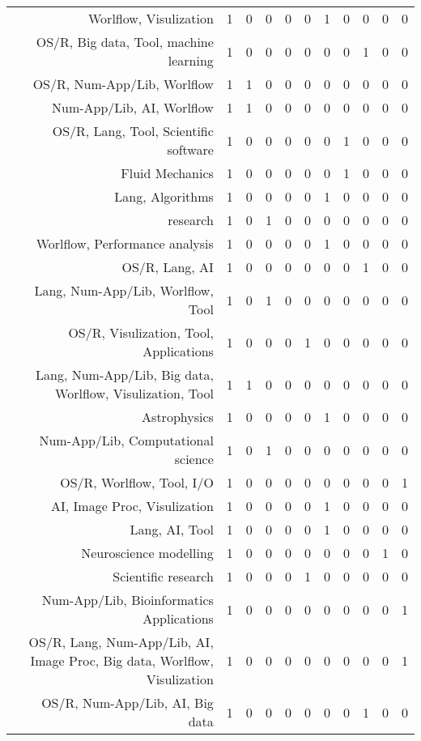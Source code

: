 {\begin{landscape}
\begin{longtable}[htb]{r|c|c|c|c|c|c|c|c|c|c}
{Worlflow, Visulization} & 1 & 0 & 0 & 0 & 0 & 1 & 0 & 0 & 0 & 0 \\%
{OS/R, Big data, Tool, machine learning} & 1 & 0 & 0 & 0 & 0 & 0 & 0 & 1 & 0 & 0 \\%
{OS/R, Num-App/Lib, Worlflow} & 1 & 1 & 0 & 0 & 0 & 0 & 0 & 0 & 0 & 0 \\%
{Num-App/Lib, AI, Worlflow} & 1 & 1 & 0 & 0 & 0 & 0 & 0 & 0 & 0 & 0 \\%
{OS/R, Lang, Tool, Scientific software} & 1 & 0 & 0 & 0 & 0 & 0 & 1 & 0 & 0 & 0 \\%
{Fluid Mechanics} & 1 & 0 & 0 & 0 & 0 & 0 & 1 & 0 & 0 & 0 \\%
{Lang, Algorithms} & 1 & 0 & 0 & 0 & 0 & 1 & 0 & 0 & 0 & 0 \\%
{research} & 1 & 0 & 1 & 0 & 0 & 0 & 0 & 0 & 0 & 0 \\%
{Worlflow, Performance analysis} & 1 & 0 & 0 & 0 & 0 & 1 & 0 & 0 & 0 & 0 \\%
{OS/R, Lang, AI} & 1 & 0 & 0 & 0 & 0 & 0 & 0 & 1 & 0 & 0 \\%
{Lang, Num-App/Lib, Worlflow, Tool} & 1 & 0 & 1 & 0 & 0 & 0 & 0 & 0 & 0 & 0 \\%
{OS/R, Visulization, Tool, Applications} & 1 & 0 & 0 & 0 & 1 & 0 & 0 & 0 & 0 & 0 \\%
{Lang, Num-App/Lib, Big data, Worlflow, Visulization, Tool} & 1 & 1 & 0 & 0 & 0 & 0 & 0 & 0 & 0 & 0 \\%
{Astrophysics} & 1 & 0 & 0 & 0 & 0 & 1 & 0 & 0 & 0 & 0 \\%
{Num-App/Lib, Computational science} & 1 & 0 & 1 & 0 & 0 & 0 & 0 & 0 & 0 & 0 \\%
{OS/R, Worlflow, Tool, I/O} & 1 & 0 & 0 & 0 & 0 & 0 & 0 & 0 & 0 & 1 \\%
{AI, Image Proc, Visulization} & 1 & 0 & 0 & 0 & 0 & 1 & 0 & 0 & 0 & 0 \\%
{Lang, AI, Tool} & 1 & 0 & 0 & 0 & 0 & 1 & 0 & 0 & 0 & 0 \\%
{Neuroscience modelling} & 1 & 0 & 0 & 0 & 0 & 0 & 0 & 0 & 1 & 0 \\%
{Scientific research} & 1 & 0 & 0 & 0 & 1 & 0 & 0 & 0 & 0 & 0 \\%
{Num-App/Lib, Bioinformatics Applications} & 1 & 0 & 0 & 0 & 0 & 0 & 0 & 0 & 0 & 1 \\%
{OS/R, Lang, Num-App/Lib, AI, Image Proc, Big data, Worlflow, Visulization} & 1 & 0 & 0 & 0 & 0 & 0 & 0 & 0 & 0 & 1 \\%
{OS/R, Num-App/Lib, AI, Big data} & 1 & 0 & 0 & 0 & 0 & 0 & 0 & 1 & 0 & 0 \\%

\end{longtable}
\end{landscape}}
